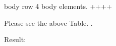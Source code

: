\documentclass[letterpaper,12pt,english]{sphinxmanual}
\begin{document}
\begin{sphinxVerbatim}[commandchars=\\\{\}]
         body row 4             \textbar{}            \textbar{} \PYGZhy{} body elements.    \textbar{}
        +\PYGZhy{}\PYGZhy{}\PYGZhy{}\PYGZhy{}\PYGZhy{}\PYGZhy{}\PYGZhy{}\PYGZhy{}\PYGZhy{}\PYGZhy{}\PYGZhy{}\PYGZhy{}\PYGZhy{}\PYGZhy{}\PYGZhy{}\PYGZhy{}\PYGZhy{}\PYGZhy{}\PYGZhy{}\PYGZhy{}\PYGZhy{}\PYGZhy{}\PYGZhy{}\PYGZhy{}+\PYGZhy{}\PYGZhy{}\PYGZhy{}\PYGZhy{}\PYGZhy{}\PYGZhy{}\PYGZhy{}\PYGZhy{}\PYGZhy{}\PYGZhy{}\PYGZhy{}\PYGZhy{}+\PYGZhy{}\PYGZhy{}\PYGZhy{}\PYGZhy{}\PYGZhy{}\PYGZhy{}\PYGZhy{}\PYGZhy{}\PYGZhy{}\PYGZhy{}\PYGZhy{}\PYGZhy{}\PYGZhy{}\PYGZhy{}\PYGZhy{}\PYGZhy{}\PYGZhy{}\PYGZhy{}\PYGZhy{}\PYGZhy{}\PYGZhy{}+

Please see the above Table. .
\end{sphinxVerbatim}

Result:
\end{document}
